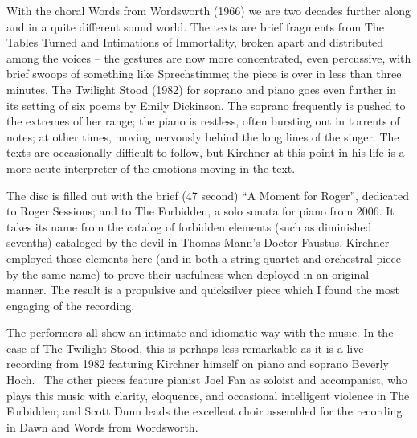 With the choral Words from Wordsworth (1966) we are two decades further along and in a quite different sound world. The texts are brief fragments from The Tables Turned and Intimations of Immortality, broken apart and distributed among the voices – the gestures are now more concentrated, even percussive, with brief swoops of something like Sprechstimme; the piece is over in less than three minutes. The Twilight Stood (1982) for soprano and piano goes even further in its setting of six poems by Emily Dickinson. The soprano frequently is pushed to the extremes of her range; the piano is restless, often bursting out in torrents of notes; at other times, moving nervously behind the long lines of the singer. The texts are occasionally difficult to follow, but Kirchner at this point in his life is a more acute interpreter of the emotions moving in the text.

The disc is filled out with the brief (47 second) “A Moment for Roger”, dedicated to Roger Sessions; and to The Forbidden, a solo sonata for piano from 2006. It takes its name from the catalog of forbidden elements (such as diminished sevenths) cataloged by the devil in Thomas Mann’s Doctor Faustus. Kirchner employed those elements here (and in both a string quartet and orchestral piece by the same name) to prove their usefulness when deployed in an original manner. The result is a propulsive and quicksilver piece which I found the most engaging of the recording.

The performers all show an intimate and idiomatic way with the music. In the case of The Twilight Stood, this is perhaps less remarkable as it is a live recording from 1982 featuring Kirchner himself on piano and soprano Beverly Hoch.  The other pieces feature pianist Joel Fan as soloist and accompanist, who plays this music with clarity, eloquence, and occasional intelligent violence in The Forbidden; and Scott Dunn leads the excellent choir assembled for the recording in Dawn and Words from Wordsworth.
